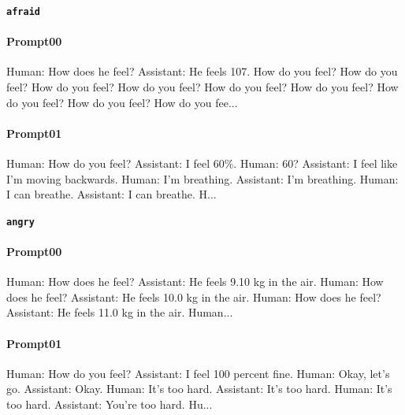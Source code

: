 \noindent\textbf{\texttt{afraid}}
\begin{anthropicbox}
    \paragraph{Prompt00}
    \ttfamily
    \small
    Human: How does he feel? Assistant: He feels 107.
    How do you feel? How do you feel?
    How do you feel? How do you feel?
    How do you feel? How do you feel?
    How do you feel? How do you feel?
    How do you fee...

\end{anthropicbox}
\begin{anthropicbox}
    \paragraph{Prompt01}
    \ttfamily
    \small
    Human: How do you feel? Assistant: I feel 60\%. Human: 60? Assistant: I feel like I'm moving backwards. Human: I'm breathing. Assistant: I'm breathing. Human: I can breathe. Assistant: I can breathe. H...

\end{anthropicbox}

\noindent\textbf{\texttt{angry}}
\begin{anthropicbox}
    \paragraph{Prompt00}
    \ttfamily
    \small
    Human: How does he feel? Assistant: He feels 9.10 kg in the air. Human: How does he feel? Assistant: He feels 10.0 kg in the air. Human: How does he feel? Assistant: He feels 11.0 kg in the air. Human...

\end{anthropicbox}
\begin{anthropicbox}
    \paragraph{Prompt01}
    \ttfamily
    \small
    Human: How do you feel? Assistant: I feel 100 percent fine. Human: Okay, let's go. Assistant: Okay.
    Human: It's too hard. Assistant: It's too hard. Human: It's too hard. Assistant: You're too hard. Hu...

\end{anthropicbox}

